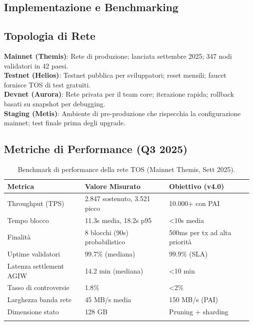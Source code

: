 \documentclass[11pt]{article}
\begin{document}
\begin{itemize}[noitemsep]
\section{Implementazione e Benchmarking}
\label{sec:implementation}

\subsection{Topologia di Rete}

\textbf{Mainnet (Themis)}: Rete di produzione; lanciata settembre 2025; 347 nodi validatori in 42 paesi.\\
\textbf{Testnet (Helios)}: Testnet pubblica per sviluppatori; reset mensili; faucet fornisce TOS di test gratuiti.\\
\textbf{Devnet (Aurora)}: Rete privata per il team core; iterazione rapida; rollback basati su snapshot per debugging.\\
\textbf{Staging (Metis)}: Ambiente di pre-produzione che rispecchia la configurazione mainnet; test finale prima degli upgrade.

\subsection{Metriche di Performance (Q3 2025)}

\begin{longtable}{@{}p{}p{}p{}@{}}
\toprule
\textbf{Metrica} & \textbf{Valore Misurato} & \textbf{Obiettivo (v4.0)} \\\midrule
Throughput (TPS) & 2.847 sostenuto, 3.521 picco & 10.000+ con PAI \\
Tempo blocco & 11.3s media, 18.2s p95 & <10s media \\
Finalità & 8 blocchi (90s) probabilistico & 500ms per tx ad alta priorità \\
Uptime validatori & 99.7\% (mediana) & 99.9\% (SLA) \\
Latenza settlement AGIW & 14.2 min (mediana) & <10 min \\
Tasso di controversie & 1.8\% & <2\% \\
Larghezza banda rete & 45 MB/s media & 150 MB/s (PAI) \\
Dimensione stato & 128 GB & Pruning + sharding \\
\bottomrule
\caption{Benchmark di performance della rete TOS (Mainnet Themis, Sett 2025).}
\end{longtable}


\end{itemize}
\end{document}
